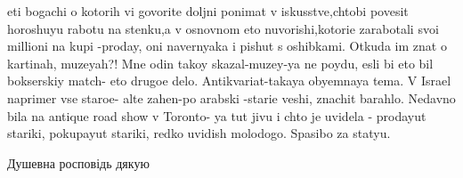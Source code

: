  
 
 
 
 
\zzSecCmt

\begin{itemize} %

eti bogachi o kotorih vi govorite doljni ponimat v iskusstve,chtobi povesit
horoshuyu rabotu na stenku,a v osnovnom eto nuvorishi,kotorie zarabotali svoi
millioni na kupi -proday, oni navernyaka i pishut s oshibkami. Otkuda im znat o
kartinah, muzeyah?! Mne odin takoy skazal-muzey-ya ne poydu, esli bi eto bil
bokserskiy match- eto drugoe delo. Antikvariat-takaya obyemnaya tema. V Israel
naprimer vse staroe- alte zahen-po arabski -starie veshi, znachit barahlo.
Nedavno bila na antique road show v Toronto- ya tut jivu i chto je uvidela -
prodayut stariki, pokupayut stariki, redko uvidish molodogo. Spasibo za statyu.

Душевна росповідь дякую
\end{itemize} %

